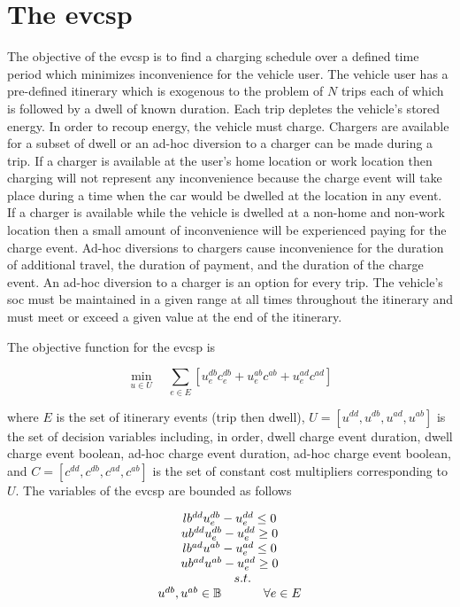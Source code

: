 \documentclass[12pt]{article}
\begin{document}
\section*{The \gls{evcsp}}

The objective of the \gls{evcsp} is to find a charging schedule over a defined time period which minimizes inconvenience for the vehicle user. The vehicle user has a pre-defined itinerary which is exogenous to the problem of $N$ trips each of which is followed by a dwell of known duration. Each trip depletes the vehicle's stored energy. In order to recoup energy, the vehicle must charge. Chargers are available for a subset of dwell or an ad-hoc diversion to a charger can be made during a trip. If a charger is available at the user's home location or work location then charging will not represent any inconvenience because the charge event will take place during a time when the car would be dwelled at the location in any event. If a charger is available while the vehicle is dwelled at a non-home and non-work location then a small amount of inconvenience will be experienced paying for the charge event. Ad-hoc diversions to chargers cause inconvenience for the duration of additional travel, the duration of payment, and the duration of the charge event. An ad-hoc diversion to a charger is an option for every trip. The vehicle's \gls{soc} must be maintained in a given range at all times throughout the itinerary and must meet or exceed a given value at the end of the itinerary.

The objective function for the \gls{evcsp} is

\begin{equation}
	\min_{u\in U}\quad \sum_{e\in E}[u_e^{db}c_e^{db}+u_e^{ab}c^{ab}+u_e^{ad}c^{ad}] \label{eq:obj}
\end{equation}

where $E$ is the set of itinerary events (trip then dwell), $U=[u^{dd},u^{db},u^{ad},u^{ab}]$ is the set of decision variables including, in order, dwell charge event duration, dwell charge event boolean, ad-hoc charge event duration, ad-hoc charge event boolean, and  $C=[c^{dd},c^{db},c^{ad},c^{ab}]$ is the set of constant cost multipliers corresponding to $U$. The variables of the \gls{evcsp} are bounded as follows

\begin{equation}
	\begin{array}{ccc}
		\multicolumn{3}{c}{lb^{dd}u_{e}^{db}-u_{e}^{dd}\leq 0}\\
		\multicolumn{3}{c}{ub^{dd}u_{e}^{db}-u_{e}^{dd}\geq 0}\\
		\multicolumn{3}{c}{lb^{ad}u^{ab}-u_{e}^{ad}\leq 0}\\
		\multicolumn{3}{c}{ub^{ad}u^{ab}-u_{e}^{ad}\geq 0}\\
		& s.t. & \\
		u^{db}, u^{ab}\in\mathbb{B} && \forall e\in E\\
	\end{array}
\end{equation}
\end{document}
